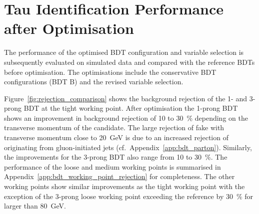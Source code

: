 

\section{Tau Identification Performance after Optimisation}
\label{sec:bdt_perf}
The performance of the optimised BDT configuration and variable selection is
subsequently evaluated on simulated data and compared with the reference BDTs
before optimisation. The optimisations include the conservative BDT
configurations (BDT B) and the revised variable selection.

Figure~\ref{fig:rejection_comparison} shows the background rejection of the 1-
and 3-prong BDT at the tight working point. After optimisation the 1-prong BDT
shows an improvement in background rejection of \num{10} to \SI{30}{\percent}
depending on the transverse momentum of the \tauhadvis candidate. The large
rejection of fake \tauhadvis with transverse momentum close to \SI{20}{\GeV} is
due to an increased rejection of \tauhadvis originating from gluon-initiated
jets (cf.\ Appendix~\ref{app:bdt_parton}).  Similarly,
the improvements for the 3-prong BDT also range from \num{10} to
\SI{30}{\percent}. The performance of the loose and medium working points is
summarised in Appendix~\ref{app:bdt_working_point_rejection} for completeness.
The other working points show similar improvements as the tight working point
with the exception of the 3-prong loose working point exceeding the reference by
\SI{30}{\percent} for \tauhadvis \pt larger than \SI{80}{\GeV}.

